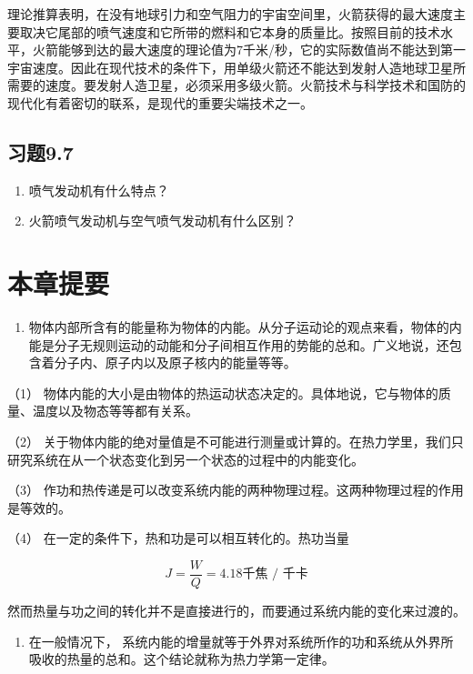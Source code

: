 理论推算表明，在没有地球引力和空气阻力的宇宙空间里，火箭获得的最大速度主要取决它尾部的喷气速度和它所带的燃料和它本身的质量比。按照目前的技术水平，火箭能够到达的最大速度的理论值为7千米/秒，它的实际数值尚不能达到第一宇宙速度。因此在现代技术的条件下，用单级火箭还不能达到发射人造地球卫星所需要的速度。要发射人造卫星，必须采用多级火箭。火箭技术与科学技术和国防的现代化有着密切的联系，是现代的重要尖端技术之一。

\subsection{习题9.7}\label{ux4e60ux98989.7}

\begin{enumerate}
\def\labelenumi{\arabic{enumi}.}
\item
  喷气发动机有什么特点？
\item
  火箭喷气发动机与空气喷气发动机有什么区别？
\end{enumerate}

\section{本章提要}\label{ux672cux7ae0ux63d0ux8981-8}

\begin{enumerate}
\def\labelenumi{\arabic{enumi}.}
\tightlist
\item
  物体内部所含有的能量称为物体的内能。从分子运动论的观点来看，物体的内能是分子无规则运动的动能和分子间相互作用的势能的总和。广义地说，还包含着分子内、原子内以及原子核内的能量等等。
\end{enumerate}

（1）
物体内能的大小是由物体的热运动状态决定的。具体地说，它与物体的质量、温度以及物态等等都有关系。

（2）
关于物体内能的绝对量值是不可能进行测量或计算的。在热力学里，我们只研究系统在从一个状态变化到另一个状态的过程中的内能变化。

（3）
作功和热传递是可以改变系统内能的两种物理过程。这两种物理过程的作用是等效的。

（4） 在一定的条件下，热和功是可以相互转化的。热功当量

\[
J = \frac {W}{Q} = 4.18 \text{千焦 / 千卡}
\]

然而热量与功之间的转化并不是直接进行的，而要通过系统内能的变化来过渡的。

\begin{enumerate}
\def\labelenumi{\arabic{enumi}.}
\setcounter{enumi}{1}
\tightlist
\item
  在一般情况下，
  系统内能的增量就等于外界对系统所作的功和系统从外界所吸收的热量的总和。这个结论就称为热力学第一定律。
\end{enumerate}

